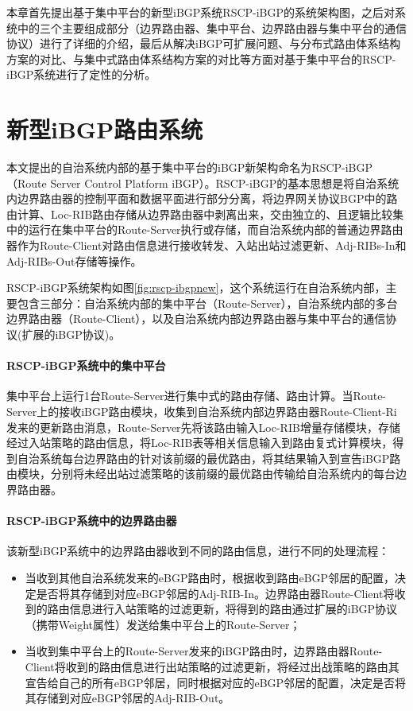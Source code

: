 本章首先提出基于集中平台的新型iBGP系统RSCP-iBGP的系统架构图，之后对系统中的三个主要组成部分（边界路由器、集中平台、边界路由器与集中平台的通信协议）进行了详细的介绍，最后从解决iBGP可扩展问题、与分布式路由体系结构方案的对比、与集中式路由体系结构方案的对比等方面对基于集中平台的RSCP-iBGP系统进行了定性的分析。

\section{新型iBGP路由系统}
本文提出的自治系统内部的基于集中平台的iBGP新架构命名为RSCP-iBGP（Route Server Control Platform iBGP）。RSCP-iBGP的基本思想是将自治系统内边界路由器的控制平面和数据平面进行部分分离，将边界网关协议BGP中的路由计算、Loc-RIB路由存储从边界路由器中剥离出来，交由独立的、且逻辑比较集中的运行在集中平台的Route-Server执行或存储，而自治系统内部的普通边界路由器作为Route-Client对路由信息进行接收转发、入站出站过滤更新、Adj-RIBs-In和Adj-RIBs-Out存储等操作。

RSCP-iBGP系统架构如图\ref{fig:rscp-ibgpnew}，这个系统运行在自治系统内部，主要包含三部分：自治系统内部的集中平台（Route-Server），自治系统内部的多台边界路由器（Route-Client），以及自治系统内部边界路由器与集中平台的通信协议(扩展的iBGP协议)。

\paragraph{RSCP-iBGP系统中的集中平台} 集中平台上运行1台Route-Server进行集中式的路由存储、路由计算。当Route-Server上的接收iBGP路由模块，收集到自治系统内部边界路由器Route-Client-Ri发来的更新路由消息，Route-Server先将该路由输入Loc-RIB增量存储模块，存储经过入站策略的路由信息，将Loc-RIB表等相关信息输入到路由复式计算模块，得到自治系统每台边界路由的针对该前缀的最优路由，将其结果输入到宣告iBGP路由模块，分别将未经出站过滤策略的该前缀的最优路由传输给自治系统内的每台边界路由器。

\paragraph{RSCP-iBGP系统中的边界路由器} 该新型iBGP系统中的边界路由器收到不同的路由信息，进行不同的处理流程：

\begin{itemize}
    \item 当收到其他自治系统发来的eBGP路由时，根据收到路由eBGP邻居的配置，决定是否将其存储到对应eBGP邻居的Adj-RIB-In。边界路由器Route-Client将收到的路由信息进行入站策略的过滤更新，将得到的路由通过扩展的iBGP协议（携带Weight属性）发送给集中平台上的Route-Server；
    \item 当收到集中平台上的Route-Server发来的iBGP路由时，边界路由器Route-Client将收到的路由信息进行出站策略的过滤更新，将经过出战策略的路由其宣告给自己的所有eBGP邻居，同时根据对应的eBGP邻居的配置，决定是否将其存储到对应eBGP邻居的Adj-RIB-Out。
\end{itemize}

